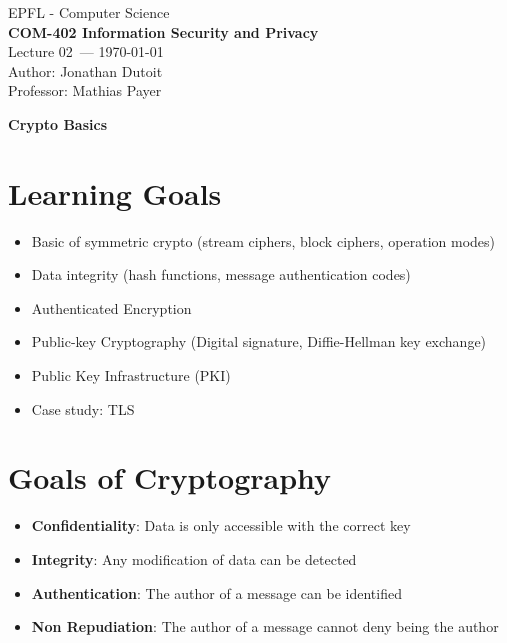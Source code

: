 \documentclass[11pt]{article}
\newcommand{\coursename}{COM-402 Information Security and Privacy}
\newcommand{\lecturenum}{02}
\newcommand{\lecturedate}{\today}
\begin{document}
\begin{center}
  {\large EPFL - Computer Science} \\[0.5em]
  {\Large \textbf{\coursename}} \\[0.5em]
  {\large Lecture \lecturenum\ --- \lecturedate} \\[0.5em]
  {\large Author: Jonathan Dutoit} \\
  {\large Professor: Mathias Payer} \\
\end{center}

\vspace{2cm}

\begin{center}
  {\LARGE \textbf{Crypto Basics}}
\end{center}

\vspace{1cm}	

\section*{Learning Goals}

\begin{itemize}
	\item Basic of symmetric crypto (stream ciphers, block ciphers, operation modes)
	\item Data integrity (hash functions, message authentication codes)
	\item Authenticated Encryption
	\item Public-key Cryptography (Digital signature, Diffie-Hellman key exchange)
	\item Public Key Infrastructure (PKI)
	\item Case study: TLS
\end{itemize}

\section*{Goals of Cryptography}

\begin{itemize}
	\item \textbf{Confidentiality}: Data is only accessible with the correct key
	\item \textbf{Integrity}: Any modification of data can be detected
	\item \textbf{Authentication}: The author of a message can be identified
	\item \textbf{Non Repudiation}: The author of a message cannot deny being the author
\end{itemize}
\end{document}
